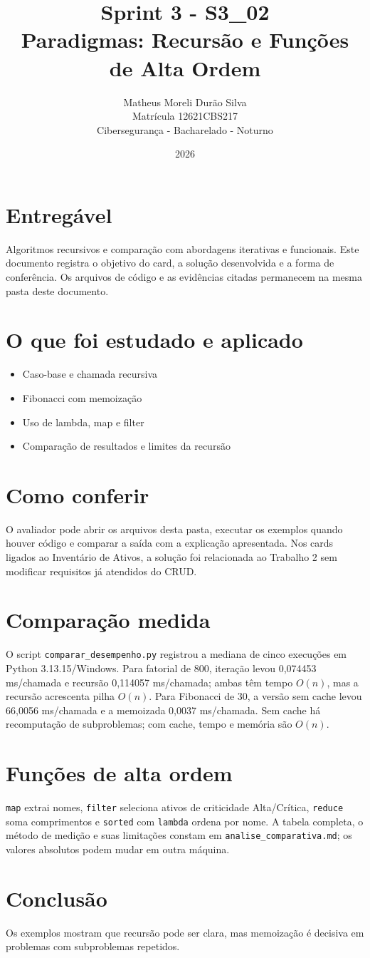 \documentclass[12pt]{article}
\title{Sprint 3 - S3\_02\\Paradigmas: Recursão e Funções de Alta Ordem}
\author{Matheus Moreli Durão Silva\\Matrícula 12621CBS217\\Cibersegurança - Bacharelado - Noturno}
\date{2026}
\begin{document}
\maketitle

\section*{Entregável}
Algoritmos recursivos e comparação com abordagens iterativas e funcionais. Este documento registra o objetivo do card, a solução desenvolvida e a forma de conferência. Os arquivos de código e as evidências citadas permanecem na mesma pasta deste documento.

\section*{O que foi estudado e aplicado}
\begin{itemize}
\item Caso-base e chamada recursiva
\item Fibonacci com memoização
\item Uso de lambda, map e filter
\item Comparação de resultados e limites da recursão
\end{itemize}

\section*{Como conferir}
O avaliador pode abrir os arquivos desta pasta, executar os exemplos quando houver código e comparar a saída com a explicação apresentada. Nos cards ligados ao Inventário de Ativos, a solução foi relacionada ao Trabalho 2 sem modificar requisitos já atendidos do CRUD.

\section*{Comparação medida}
O script \texttt{comparar\_desempenho.py} registrou a mediana de cinco execuções em Python 3.13.15/Windows. Para fatorial de 800, iteração levou 0,074453 ms/chamada e recursão 0,114057 ms/chamada; ambas têm tempo $O(n)$, mas a recursão acrescenta pilha $O(n)$. Para Fibonacci de 30, a versão sem cache levou 66,0056 ms/chamada e a memoizada 0,0037 ms/chamada. Sem cache há recomputação de subproblemas; com cache, tempo e memória são $O(n)$.
\section*{Funções de alta ordem}
\texttt{map} extrai nomes, \texttt{filter} seleciona ativos de criticidade Alta/Crítica, \texttt{reduce} soma comprimentos e \texttt{sorted} com \texttt{lambda} ordena por nome. A tabela completa, o método de medição e suas limitações constam em \texttt{analise\_comparativa.md}; os valores absolutos podem mudar em outra máquina.
\section*{Conclusão}
Os exemplos mostram que recursão pode ser clara, mas memoização é decisiva em problemas com subproblemas repetidos.
\end{document}
